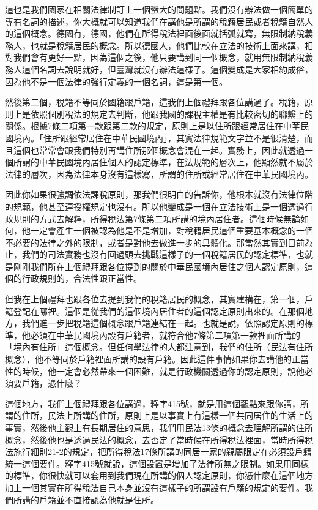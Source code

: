 \documentclass[]{ctexbook}
\begin{document}
這也是我們國家在相關法律制訂上一個蠻大的問題點。我們沒有辦法做一個簡單的專有名詞的描述，你大概就可以知道我們在講他是所謂的稅籍居民或者稅籍自然人的這個概念。德國有，德國，他們在所得稅法裡面後面就括弧就寫，無限制納稅義務人，也就是稅籍居民的概念。所以德國人，他們比較在立法的技術上面來講，相對我們會有更好一點，因為這個之後，他只要講到同一個概念，就用無限制納稅義務人這個名詞去說明就好，但臺灣就沒有辦法這樣子。這個變成是大家相約成俗，因為他不是一個法律的強行定義的一個名詞，這是第一個。

然後第二個，稅籍不等同於國籍跟戶籍，這我們上個禮拜跟各位講過了。稅籍，原則上是依照個別稅法的規定去判斷，他跟我國的課稅主權是有比較密切的聯繫上的關係。根據7條二項第一款跟第二款的規定，原則上是以住所跟經常居住在中華民國境內。「住所跟經常居住在中華民國境內」，其實法律規範文字並不是很清楚，而且這個也常常會跟我們特別再講住所那個概念會混在一起。實務上，因此就透過一個所謂的中華民國境內居住個人的認定標準，在法規範的層次上，他顯然就不屬於法律的層次，因為法律本身沒有這樣寫，所謂的住所或經常居住在中華民國境內。

因此你如果很強調依法課稅原則，那我們很明白的告訴你，他根本就沒有法律位階的規範，他甚至連授權規定也沒有。所以他變成是一個在立法技術上是一個透過行政規則的方式去解釋，所得稅法第7條第二項所講的境內居住者。這個時候無論如何，他一定會產生一個被認為他是不是增加，對稅籍居民這個重要基本概念的一個不必要的法律之外的限制，或者是對他去做進一步的具體化。那當然其實到目前為止，我們的司法實務也沒有回過頭去挑戰這樣子的一個稅籍居民的認定標準，也就是剛剛我們所在上個禮拜跟各位提到的關於中華民國境內居住之個人認定原則，這個的行政規則的，合法性跟正當性。

但我在上個禮拜也跟各位去提到我們的稅籍居民的概念，其實建構在，第一個，戶籍登記在哪裡。這個是從我們的這個境內居住者的這個認定原則出來的。在那個地方，我們進一步把稅籍這個概念跟戶籍連結在一起。也就是說，依照認定原則的標準，他必須在中華民國境內設有戶籍者，就符合他7條第二項第一款裡面所講的「境內有住所」這個概念。但任何學法律的人都注意到，我們的住所（民法有住所概念），他不等同於戶籍裡面所講的設有戶籍。因此這件事情如果你去講他的正當性的時候，他一定會必然帶來一個困難，就是行政機關透過你的認定原則，說他必須要戶籍，憑什麼？

這個地方，我們上個禮拜跟各位講過，釋字415號，就是用這個觀點來跟你講，所謂的住所，民法上所講的住所，原則上是以事實上有這樣一個共同居住的生活上的事實，然後他主觀上有長期居住的意思，我們用民法13條的概念去理解所謂的住所概念，然後他也是透過民法的概念，去否定了當時候在所得稅法裡面，當時所得稅法施行細則21-2的規定，把所得稅法17條所講的同居一家的親屬限定在必須設戶籍統一這個要件。釋字415號就說，這個設置是增加了法律所無之限制。如果用同樣的標準，你很快就可以套用到我們現在所講的個人認定原則，你憑什麼在這個地方加上一個其實在所得稅法自己本身並沒有這樣子的所謂設有戶籍的規定的要件。我們所講的戶籍並不直接認為他就是住所。
\end{document}
